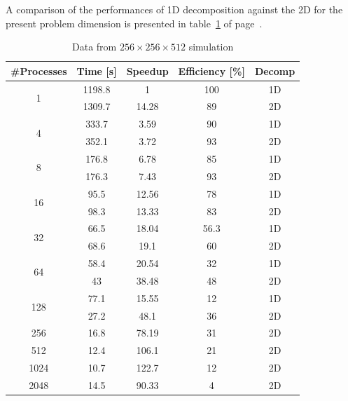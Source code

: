 \par
A comparison of the performances of 1D decomposition against the 2D for the present problem dimension is presented in table~\ref{128:data} of page~\pageref{128:data}.

\begin{table}
\caption{Data from $256\times 256\times 512$  simulation}
\begin{center}
\begin{tabular}{c c c c c}
\toprule
\textbf{\#Processes} & \textbf{Time [s]} & \textbf{Speedup} & \textbf{Efficiency [\%]} & \textbf{Decomp}\\
\midrule
\multirow{2}{*}{1} &  1198.8 & 1 & 100 & 1D\\
& 1309.7 & 14.28 & 89 & 2D\\
\hline
\multirow{2}{*}{4} &  333.7 & 3.59 & 90 & 1D\\
& 352.1 & 3.72 & 93 & 2D \\
\hline
\multirow{2}{*}{8} &  176.8 & 6.78 & 85 & 1D\\
& 176.3 & 7.43 & 93 & 2D\\
\hline
\multirow{2}{*}{16} & 95.5 & 12.56 & 78 & 1D\\
& 98.3 & 13.33 & 83 & 2D\\
\hline
\multirow{2}{*}{32} & 66.5 & 18.04 & 56.3 & 1D\\
& 68.6 & 19.1 & 60 & 2D\\
\hline
\multirow{2}{*}{64} & 58.4 & 20.54 & 32 & 1D\\
& 43 & 38.48 & 48 & 2D\\
\hline 
\multirow{2}{*}{128} & 77.1 & 15.55 & 12 & 1D\\
& 27.2 & 48.1 & 36 & 2D\\
\hline
256 & 16.8 & 78.19 & 31 & 2D\\
512 & 12.4 & 106.1 & 21 & 2D\\
1024 & 10.7 & 122.7 & 12 & 2D\\
2048 & 14.5 & 90.33 & 4 & 2D\\
\bottomrule
\end{tabular}
\end{center}
\label{128:data}
\end{table}


